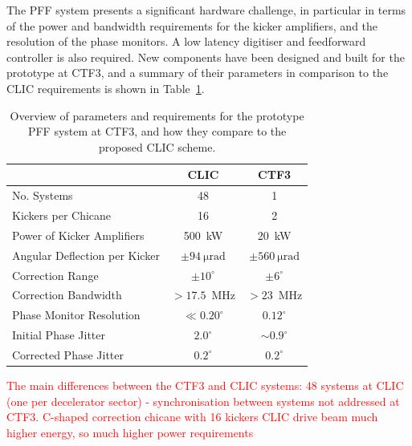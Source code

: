 \documentclass[%
 reprint,
superscriptaddress,
 amsmath,amssymb,
 prl,
]{revtex4-1}
\begin{document}


The PFF system presents a significant hardware challenge, in particular in 
terms of the power and bandwidth requirements for the kicker amplifiers, and 
the resolution of the phase monitors. A low latency digitiser and feedforward 
controller is also required. New 
components have been designed and built for the prototype at CTF3, and a 
summary of their parameters in comparison to the CLIC requirements is shown in 
Table~\ref{tab:pffspecs}. 

\begin{table}
	\caption{\label{tab:pffspecs}
	    Overview of parameters and requirements for the prototype PFF system at 
	    CTF3, and how they compare to the proposed CLIC scheme.}
\begin{ruledtabular}
	\begin{tabular}{lcc}
		 & CLIC & CTF3 \\
		\hline
		No. Systems & 48 & 1 \\
		Kickers per Chicane & 16 & 2 \\
		Power of Kicker Amplifiers & 500~kW & 20~kW \\
		Angular Deflection per Kicker & \(\pm94~\mathrm{\mu rad}\) & 
		\(\pm560~\mathrm{\mu rad}\) \\
		Correction Range & \(\pm 10^\circ\) & \(\pm 6^\circ\) \\
		Correction Bandwidth & \(>17.5\)~MHz & \(>23\)~MHz \\
		Phase Monitor Resolution & \(\ll 0.20^\circ\) & \(0.12^\circ\)  \\
		Initial Phase Jitter & \(2.0^\circ\) & \(\sim 0.9^\circ\) \\
		Corrected Phase Jitter & \(0.2^\circ\) & \(0.2^\circ\) \\
	\end{tabular}
\end{ruledtabular}
\end{table}

\textcolor{red}{The main differences between the CTF3 and CLIC systems:
48 systems at CLIC (one per decelerator sector) - synchronisation between 
systems not addressed at CTF3.
C-shaped correction chicane with 16 kickers
CLIC drive beam much higher energy, so much higher power requirements}
\end{document}

